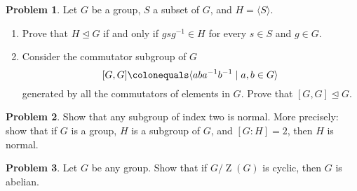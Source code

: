 \documentclass[11pt]{article}
\def\norm{\mathrel{\unlhd}}
\def\norm{\mathrel{\unlhd}}
\DeclareMathOperator{\Z}{Z}
\theoremstyle{definition}
\newtheorem{problem}{Problem}
\begin{document}
\begin{problem}
Let $G$ be a group, $S$ a subset of $G$, and $H=\langle S \rangle$.  

\begin{enumerate}[label=(4.\arabic*)]
\item Prove that $H \norm G$ if and only if $gsg^{-1}\in H$ for every $s\in S$ and $g\in G$.

\item Consider the commutator subgroup of $G$
$$[G,G] \colonequals \langle aba^{-1}b^{-1}\mid a,b\in G \rangle$$ 
generated by all the commutators of elements in $G$.
Prove that $[G,G] \norm G$.


\end{enumerate}
\end{problem}





\begin{problem}
Show that any subgroup of index two is normal. More precisely: show that if $G$ is a group, $H$ is a subgroup of $G$, and $[G:H]=2$, then $H$ is normal.	
\end{problem}




\begin{problem}
	Let $G$ be any group. Show that if $G/\Z(G)$ is cyclic, then $G$ is abelian.
\end{problem} 
\end{document}
